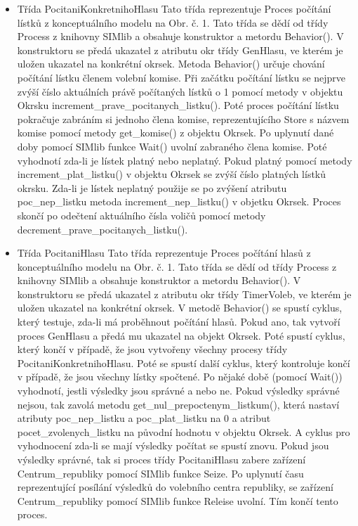 \documentclass[12pt,a4paper,titlepage,final]{article}
\begin{document}
\begin{itemize}
\item Třída PocitaniKonkretnihoHlasu
\subitem Tato třída reprezentuje Proces počítání lístků z konceptuálního modelu na Obr. č. 1. Tato třída se dědí od třídy Process z knihovny SIMlib a obsahuje konstruktor a metordu Behavior(). V konstruktoru se předá ukazatel z atributu okr třídy GenHlasu, ve kterém je uložen ukazatel na konkrétní okrsek. Metoda Behavior() určuje chování počítání lístku členem volební komise. Při začátku počítání lístku se nejprve zvýší číslo aktuálních právě počítaných lístků o 1 pomocí metody v objektu Okrsku increment\_prave\_pocitanych\_listku(). Poté proces počítání lístku pokračuje zabráním si jednoho člena komise, reprezentujícího Store s názvem komise pomocí metody get\_komise() z objektu Okrsek. Po uplynutí dané doby pomocí SIMlib funkce Wait() uvolní zabraného člena komise. Poté vyhodnotí zda-li je lístek platný nebo neplatný. Pokud platný pomocí metody increment\_plat\_listku() v objektu Okrsek se zvýší číslo platných lístků okrsku. Zda-li je lístek neplatný použije se po zvýšení atributu poc\_nep\_listku metoda increment\_nep\_listku() v objetku Okrsek. Proces skončí po odečtení aktuálního čísla voličů pomocí metody decrement\_prave\_pocitanych\_listku().

\item Třída PocitaniHlasu
\subitem Tato třída reprezentuje Proces počítání hlasů z konceptuálního modelu na Obr. č. 1. Tato třída se dědí od třídy Process z knihovny SIMlib a obsahuje konstruktor a metordu Behavior(). V konstruktoru se předá ukazatel z atributu okr třídy TimerVoleb, ve kterém je uložen ukazatel na konkrétní okrsek. V metodě Behavior() se spustí cyklus, který testuje, zda-li má proběhnout počítání hlasů. Pokud ano, tak vytvoří proces GenHlasu a předá mu ukazatel na objekt Okrsek. Poté spustí cyklus, který končí v případě, že jsou vytvořeny všechny procesy třídy PocitaniKonkretnihoHlasu. Poté se spustí další cyklus, který kontroluje končí v případě, že jsou všechny lístky spočtené. Po nějaké době (pomocí Wait()) vyhodnotí, jestli výsledky jsou správné a nebo ne. Pokud výsledky správné nejsou, tak zavolá metodu get\_nul\_prepoctenym\_listkum(), která nastaví atributy poc\_nep\_listku a poc\_plat\_listku na 0 a atribut pocet\_zvolenych\_listku na původní hodnotu v objektu Okrsek. A cyklus pro vyhodnocení zda-li se mají výsledky počítat se spustí znovu. Pokud jsou výsledky správné, tak si proces třídy PocitaniHlasu zabere zařízení Centrum\_republiky pomocí SIMlib funkce Seize. Po uplynutí času reprezentující posílání výsledků do volebního centra republiky, se zařízení Centrum\_republiky pomocí SIMlib funkce Releise uvolní. Tím končí tento proces.

\end{itemize}
\end{document}
